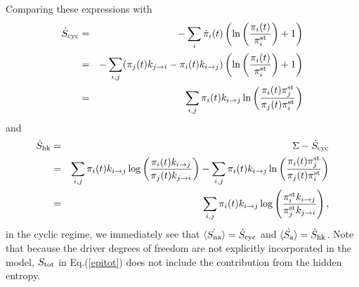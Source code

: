 \documentclass[aps,pre,amsmath,amssymb,floatfix,preprint,nofootinbib]{revtex4}
\begin{document}
Comparing these expressions with
\begin{eqnarray}
\dot S_{\rm cyc} &=& -\sum_i {\dot \pi}_i(t) \left( \ln \left(\frac{\pi_i(t)}{\pi^{\rm st}_i}\right) + 1 \right)\nonumber\\
&=& -\sum_{i,j}(\pi_j(t)k_{j \to i} - \pi_i(t)k_{i \to j}) \left( \ln \left(\frac{\pi_i(t)}{\pi^{\rm st}_i}\right) + 1 \right)\nonumber\\
&=& \sum_{i,j} \pi_i(t)k_{i \to j} \ln \left(\frac{\pi_i(t) \pi^{\rm st}_j}{\pi_j(t) \pi^{\rm st}_i}\right)\label{dscy}
\end{eqnarray}
and
\begin{eqnarray}
\dot S_{\rm hk} &=& \Sigma - \dot S_{\rm cyc}  \nonumber\\
&=& \sum_{i,j} \pi_i(t) k_{i \to j} \log \left(\frac{ \pi_i(t) k_{i \to j}}{\pi_j(t)  k_{j \to i}} \right) - \sum_{i,j} \pi_i(t)k_{i \to j} \ln \left(\frac{\pi_i(t) \pi^{\rm st}_j}{\pi_j(t) \pi^{\rm st}_i}\right)\nonumber\\
&=& \sum_{i,j} \pi_i(t) k_{i \to j} \log \left(\frac{ \pi^{\rm st}_i k_{i \to j}}{\pi^{\rm st}_j  k_{j \to i}} \right), \label{dshk}
\end{eqnarray}
in the cyclic regime, we immediately see that $\langle \dot {S_{\rm na}} \rangle = \dot S_{\rm cyc}$ and $\langle \dot {S_{\rm a}} \rangle = \dot S_{\rm hk} $. Note that because the driver degrees of freedom are not explicitly incorporated in the model, $S_{\rm tot}$ in Eq.(\ref{epitot}) does not include the contribution from the hidden entropy.
\end{document}
